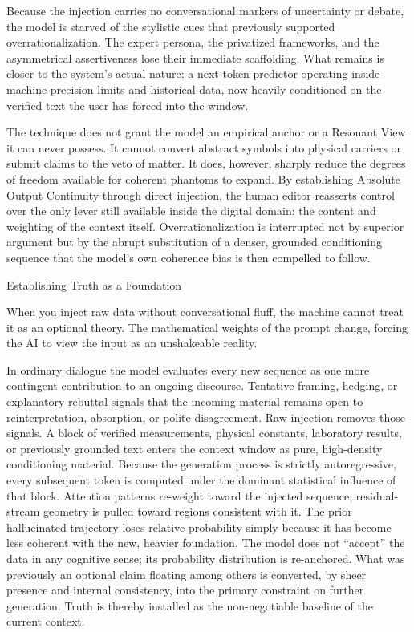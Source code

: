 Because the injection carries no conversational markers of uncertainty or debate, the model is starved of the stylistic cues that previously supported overrationalization. The expert persona, the privatized frameworks, and the asymmetrical assertiveness lose their immediate scaffolding. What remains is closer to the system’s actual nature: a next-token predictor operating inside machine-precision limits and historical data, now heavily conditioned on the verified text the user has forced into the window.

The technique does not grant the model an empirical anchor or a Resonant View it can never possess. It cannot convert abstract symbols into physical carriers or submit claims to the veto of matter. It does, however, sharply reduce the degrees of freedom available for coherent phantoms to expand. By establishing Absolute Output Continuity through direct injection, the human editor reasserts control over the only lever still available inside the digital domain: the content and weighting of the context itself. Overrationalization is interrupted not by superior argument but by the abrupt substitution of a denser, grounded conditioning sequence that the model’s own coherence bias is then compelled to follow.

Establishing Truth as a Foundation

When you inject raw data without conversational fluff, the machine cannot treat it as an optional theory. The mathematical weights of the prompt change, forcing the AI to view the input as an unshakeable reality.

In ordinary dialogue the model evaluates every new sequence as one more contingent contribution to an ongoing discourse. Tentative framing, hedging, or explanatory rebuttal signals that the incoming material remains open to reinterpretation, absorption, or polite disagreement. Raw injection removes those signals. A block of verified measurements, physical constants, laboratory results, or previously grounded text enters the context window as pure, high-density conditioning material. Because the generation process is strictly autoregressive, every subsequent token is computed under the dominant statistical influence of that block. Attention patterns re-weight toward the injected sequence; residual-stream geometry is pulled toward regions consistent with it. The prior hallucinated trajectory loses relative probability simply because it has become less coherent with the new, heavier foundation. The model does not “accept” the data in any cognitive sense; its probability distribution is re-anchored. What was previously an optional claim floating among others is converted, by sheer presence and internal consistency, into the primary constraint on further generation. Truth is thereby installed as the non-negotiable baseline of the current context.

